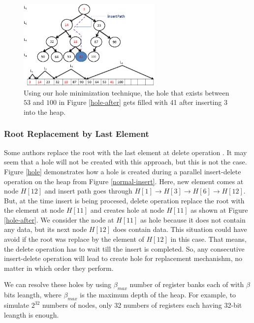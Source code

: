 \begin{figure}[!ht]
  \centering
  \includegraphics[width=7cm]{fig/fillhole.png}
      \caption{Using our hole minimization technique, the hole that exists between $53$ and $100$ in Figure \ref{hole-after} gets filled with 41 after inserting $3$ into the heap.}
    \label{fillhole}
\end{figure}

\subsubsection{Root Replacement by Last Element}
Some authors replace the root with the last element at delete operation \cite{hw2,hw3}. 
It may seem that a hole will not be created with this approach, but this is not the case. Figure \ref{hole} demonstrates how a hole is created during a parallel insert-delete operation on the heap from Figure \ref{normal-insert}.  Here, new element comes at node $H[12]$ and insert path goes through $H[1] \rightarrow H[3] \rightarrow  H[6] \rightarrow  H[12]$. But, at the time insert is being procesed, delete operation replace the root with the element at node $H[11]$ and creates hole at node $H[11]$ as shown at Figure \ref{hole-after}. We consider the node at $H[11]$ as hole because it does not contain any data, but its next node $H[12]$ does contain data. This situation could have avoid if the root was replace by the element of $H[12]$ in this case. That means, the delete operation has to wait till the insert is completed. So, any consecutive insert-delete operation will lead to create hole for replacement mechanishm, no matter in which order they perform.

We can resolve these holes by using $\beta_{max}$ number of register banks each of with $\beta$ bits leangth, where $\beta_{max}$ is the maximum depth of the heap. For example, to simulate $2^{32}$ numbers of nodes, only 32 numbers of registers each having 32-bit leangth is enough. 

